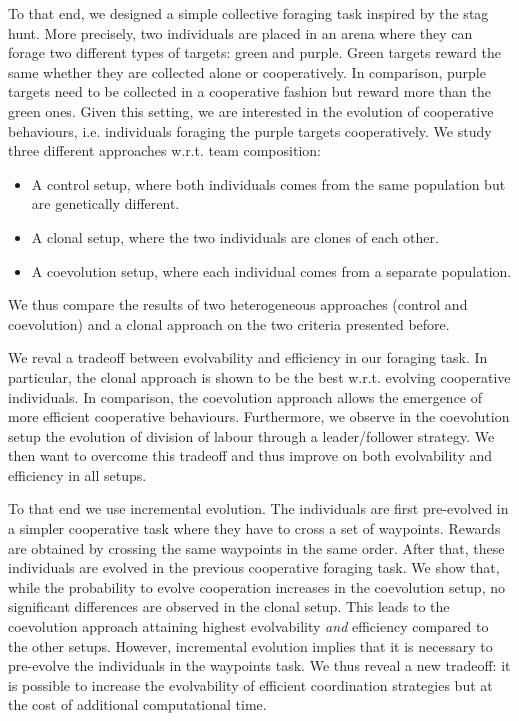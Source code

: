 To that end, we designed a simple collective foraging task inspired by the stag hunt. More precisely, two individuals are placed in an arena where they can forage two different types of targets: green and purple. Green targets reward the same whether they are collected alone or cooperatively. In comparison, purple targets need to be collected in a cooperative fashion but reward more than the green ones. Given this setting, we are interested in the evolution of cooperative behaviours, i.e. individuals foraging the purple targets cooperatively. We study three different approaches w.r.t. team composition:

\begin{itemize}
  \item{A control setup, where both individuals comes from the same population but are genetically different.}
  \item{A clonal setup, where the two individuals are clones of each other.}
  \item{A coevolution setup, where each individual comes from a separate population.}
\end{itemize}

We thus compare the results of two heterogeneous approaches (control and coevolution) and a clonal approach on the two criteria presented before.

We reval a tradeoff between evolvability and efficiency in our foraging task. In particular, the clonal approach is shown to be the best w.r.t. evolving cooperative individuals. In comparison, the coevolution approach allows the emergence of more efficient cooperative behaviours. Furthermore, we observe in the coevolution setup the evolution of division of labour through a leader/follower strategy. We then want to overcome this tradeoff and thus improve on both evolvability and efficiency in all setups.

To that end we use incremental evolution. The individuals are first pre-evolved in a simpler cooperative task where they have to cross a set of waypoints. Rewards are obtained by crossing the same waypoints in the same order. After that, these individuals are evolved in the previous cooperative foraging task. We show that, while the probability to evolve cooperation increases in the coevolution setup, no significant differences are observed in the clonal setup. This leads to the coevolution approach attaining highest evolvability \emph{and} efficiency compared to the other setups. However, incremental evolution implies that it is necessary to pre-evolve the individuals in the waypoints task. We thus reveal a new tradeoff: it is possible to increase the evolvability of efficient coordination strategies but at the cost of additional computational time.


